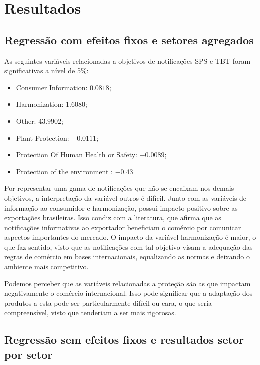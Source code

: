 \documentclass[12pt, a4paper]{article}
\begin{document}
\newpage
\section{Resultados}

\subsection{Regressão com efeitos fixos e setores agregados}



As seguintes variáveis relacionadas a objetivos de notificações SPS e TBT foram significativas a nível de 5\%:
\begin{itemize}
    \item Consumer Information: $0.0818$;
    \item Harmonization: $1.6080$;
    \item Other: $43.9902$;
    \item Plant Protection: $-0.0111$;
    \item Protection Of Human Health or Safety: $-0.0089$;
    \item Protection of the environment : $-0.43$
\end{itemize}

Por representar uma gama de notificações que não se encaixam nos demais objetivos, a interpretação da variável outros é difícil. Junto com as variáveis de informação ao consumidor e harmonização, possui impacto positivo sobre as exportações brasileiras. Isso condiz com a literatura, que afirma que as notificações informativas ao exportador beneficiam o comércio por comunicar aspectos importantes do mercado. O impacto da variável harmonização é maior, o que faz sentido, visto que as notificações com tal objetivo visam a adequação das regras de comércio em bases internacionais, equalizando as normas e deixando o ambiente mais competitivo. 

Podemos perceber que as variáveis relacionadas a proteção são as que impactam negativamente o comércio internacional. Isso pode significar que a adaptação dos produtos a esta pode ser particularmente difícil ou cara, o que seria compreensível, visto que tenderiam a ser mais rigorosas.


\subsection{Regressão sem efeitos fixos e resultados setor por setor}





\printbibliography
\end{document}
